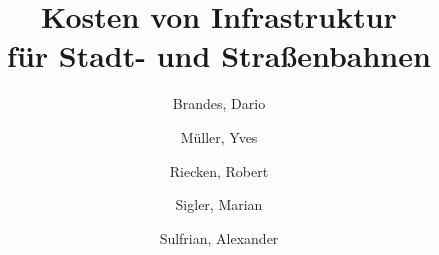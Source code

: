 \documentclass[oneside,a4paper,11pt,german]{article}
\title{Kosten von Infrastruktur \\ für Stadt- und Straßenbahnen}
\author{
  Brandes, Dario \and
  Müller, Yves \and
  Riecken, Robert \and
  Sigler, Marian \and
  Sulfrian, Alexander
}
\begin{document}
\maketitle

\begin{comment}
Gliederung:

* Einleitung


* Theorie / Grundlagen
  * Definitionen: Kein EBO, Trennung U-Bahn/Straßenbahn (Tunnel vs. nein)
  * Methode
     * wie wurden die Zahlen versucht zu ermitteln
     * welche Kennwerte wurden wie berechnet (kosten/strecken km)
     * warum sind die Kennwerte sinvoll

* Ergebnisse
  * Vorstellung der Projekte
    * Beschreibung der Strecke
    * momentaner Baustand / Plannungsstand
  * Tabelle allen Ergbnissen

* Auswertung
  * Ermittlung von Höchsts- /  Durchschnittswerten Inland getrennt U-Bahnen/Straßenbahnen
    * tabellarisch
    * mit Hilfe von Diagrammen
  * Vergleich mit den Werten im Ausland
  * Fehleranalyse (welche Außreißer existieren warum)

* Zusammenfassung


TODO:

 * Karten für alle Strecken erstellen und einfügen.
 * Tabelle mit Quellenangaben generieren.

\end{comment}













\end{document}
